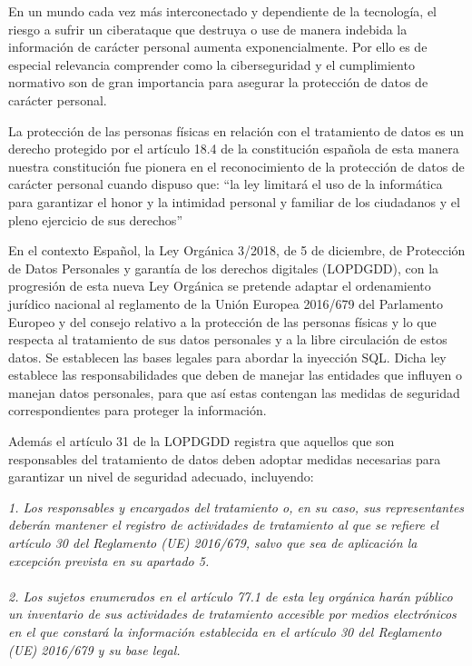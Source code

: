 \documentclass[11pt]{report}
\begin{document}
En un mundo cada vez más interconectado y dependiente de la tecnología, el riesgo a sufrir un ciberataque que destruya o use de manera indebida
la información de carácter personal aumenta exponencialmente. Por ello es de especial relevancia comprender como la ciberseguridad y el cumplimiento
normativo son de gran importancia para asegurar la protección de datos de carácter personal.

La protección de las personas físicas en relación con el tratamiento de datos es un derecho protegido por el artículo 18.4 de la constitución 
española de esta manera nuestra constitución fue pionera en el reconocimiento de la protección de datos de carácter personal cuando dispuso que: 
“la ley limitará el uso de la informática para garantizar el honor y la intimidad personal y familiar de los ciudadanos y el pleno ejercicio de sus derechos”

En el contexto Español, la Ley Orgánica 3/2018, de 5 de diciembre, de Protección de Datos Personales y garantía de los derechos digitales (LOPDGDD), 
con la progresión de esta nueva Ley Orgánica se pretende adaptar el ordenamiento jurídico nacional al reglamento de la Unión Europea 2016/679 del 
Parlamento Europeo y del consejo relativo a la protección de las personas físicas y lo que respecta al tratamiento de sus datos personales y a la 
libre circulación de estos datos. Se establecen las bases legales para abordar la inyección SQL. Dicha ley establece las responsabilidades que deben
de manejar las entidades que influyen o manejan datos personales, para que así estas contengan las medidas de seguridad correspondientes para proteger la información.

Además el artículo 31 de la LOPDGDD registra que aquellos que son responsables del tratamiento de datos deben adoptar medidas necesarias para garantizar
un nivel de seguridad adecuado, incluyendo:

\emph{1. Los responsables y encargados del tratamiento o, en su caso, sus representantes deberán mantener el registro de actividades de tratamiento al que se refiere el 
artículo 30 del Reglamento (UE) 2016/679, salvo que sea de aplicación la excepción prevista en su apartado 5.}
\\ \\
\emph{2. Los sujetos enumerados en el artículo 77.1 de esta ley orgánica harán público un inventario de sus actividades de tratamiento accesible por medios electrónicos
en el que constará la información establecida en el artículo 30 del Reglamento (UE) 2016/679 y su base legal.}
\end{document}
